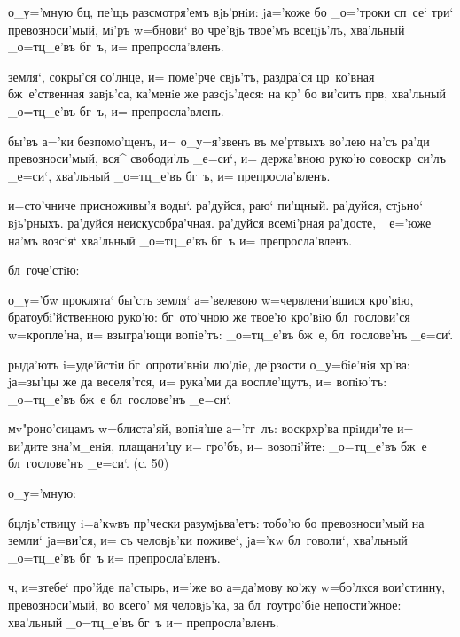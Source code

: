 
  о_у='мную бц, пе'щь разсмотря'емъ 
вjь'рнiи: jа='коже бо _о='троки сп~се` три` 
превозноси'мый, мi'ръ w=бнови` во чре'вjь твое'мъ 
всецjь'лъ, хва'льный _о=тц_е'въ бг~ъ, и= препросла'вленъ.

 земля`, сокры'ся со'лнце, и= поме'рче 
свjь'тъ, раздра'ся цр~ко'вная бж~е'ственная завjь'са, 
ка'менiе же разсjь'деся: на кр' бо ви'ситъ прв, 
хва'льный _о=тц_е'въ бг~ъ, и= препросла'вленъ.

 бы'въ а='ки безпомо'щенъ, и= о_у=я'звенъ въ 
ме'ртвыхъ во'лею на'съ ра'ди превозноси'мый, вся^ 
свободи'лъ _е=си`, и= держа'вною руко'ю совоскр~си'лъ 
_е=си`, хва'льный _о=тц_е'въ бг~ъ, и= препросла'вленъ.

  и=сто'чниче присноживы'я 
воды`. ра'дуйся, раю` пи'щный. ра'дуйся, стjьно` 
вjь'рныхъ. ра'дуйся неискусобра'чная. ра'дуйся всемi'рная 
ра'досте, _е='юже на'мъ возсiя` хва'льный _о=тц_е'въ бг~ъ 
и= препросла'вленъ.

   бл~гоче'стiю:

 о_у='бw проклята` бы'сть земля` а='велевою 
w=червлени'вшися кро'вiю, братоубi'йственною руко'ю: 
бг~ото'чною же твое'ю кро'вiю бл~гослови'ся w=кропле'на, 
и= взыгра'ющи вопiе'тъ: _о=тц_е'въ бж~е, бл~гослове'нъ 
_е=си`.

 рыда'ютъ i=уде'йстiи бг~опроти'внiи лю'дiе, 
де'рзости о_у=бiе'нiя хр'ва: jа=зы'цы же да 
веселя'тся, и= рука'ми да воспле'щутъ, и= вопiю'тъ: 
_о=тц_е'въ бж~е бл~гослове'нъ _е=си`.

 мv"роно'сицамъ w=блиста'яй, вопiя'ше а='гг~лъ: 
воскр хр'ва прiиди'те и= ви'дите зна'м_енiя, 
плащани'цу и= гро'бъ, и= возопi'йте: _о=тц_е'въ бж~е 
бл~гослове'нъ _е=си`. (с. 50)

   о_у='мную:

 бц лjь'ствицу i=а'кwвъ пр'чески 
разумjьва'етъ: тобо'ю бо превозноси'мый на земли` 
jа=ви'ся, и= съ человjь'ки поживе`, jа='кw бл~говоли`, 
хва'льный _о=тц_е'въ бг~ъ и= препросла'вленъ.

 ч, и=з\ъ тебе` про'йде па'стырь, и='же 
во а=да'мову ко'жу w=бо'лкся вои'стинну, превозноси'мый, 
во всего' мя человjь'ка, за бл~гоутро'бiе непости'жное: 
хва'льный _о=тц_е'въ бг~ъ и= препросла'вленъ.

